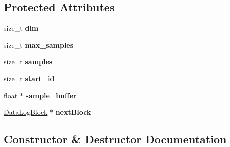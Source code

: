 \subsection*{Protected Attributes}
\begin{DoxyCompactItemize}
\item 
size\+\_\+t {\bfseries dim}\hypertarget{classpangolin_1_1_data_log_block_a1d098a02ae3ec17fe90cb621fd4003e8}{}\label{classpangolin_1_1_data_log_block_a1d098a02ae3ec17fe90cb621fd4003e8}

\item 
size\+\_\+t {\bfseries max\+\_\+samples}\hypertarget{classpangolin_1_1_data_log_block_a38dad18e71d4db9c7ddc48a3c03d2945}{}\label{classpangolin_1_1_data_log_block_a38dad18e71d4db9c7ddc48a3c03d2945}

\item 
size\+\_\+t {\bfseries samples}\hypertarget{classpangolin_1_1_data_log_block_aadeb0e8a72bca6d4b55bbb384504ff4a}{}\label{classpangolin_1_1_data_log_block_aadeb0e8a72bca6d4b55bbb384504ff4a}

\item 
size\+\_\+t {\bfseries start\+\_\+id}\hypertarget{classpangolin_1_1_data_log_block_a1a33a2d17044257c0ec1963c2ac51bb9}{}\label{classpangolin_1_1_data_log_block_a1a33a2d17044257c0ec1963c2ac51bb9}

\item 
float $\ast$ {\bfseries sample\+\_\+buffer}\hypertarget{classpangolin_1_1_data_log_block_a6731923f4fa4e50b105a1a9efd1fa653}{}\label{classpangolin_1_1_data_log_block_a6731923f4fa4e50b105a1a9efd1fa653}

\item 
\hyperlink{classpangolin_1_1_data_log_block}{Data\+Log\+Block} $\ast$ {\bfseries next\+Block}\hypertarget{classpangolin_1_1_data_log_block_a7e41bf680dc8f525d94dad4434588521}{}\label{classpangolin_1_1_data_log_block_a7e41bf680dc8f525d94dad4434588521}

\end{DoxyCompactItemize}


\subsection{Constructor \& Destructor Documentation}
